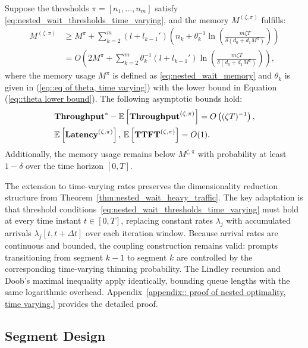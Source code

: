\begin{theorem}
\label{thm:nested_wait_heavy_traffic_time_varying}
Suppose the thresholds $\pi = [n_1, \dots, n_m]$ satisfy \eqref{eq:nested_wait_thresholds_time_varying}, and the memory $M^{(\zeta,\pi)}$ fulfills:
\[
\begin{aligned}
M^{(\zeta,\pi)}
&\geq M^{\pi} + \sum_{k=2}^m (l + l_{k-1}') \left(n_k + \theta_k^{-1} \ln\!\left( \tfrac{m \zeta T}{\delta(d_0+d_1M^\pi)} \right)\right) \\
    &= O\!\left( 2M^\pi + \sum_{k=2}^m \theta_k^{-1}  (l + l_{k-1}') \ln\!\left( \tfrac{m \zeta T}{\delta(d_0+d_1M^\pi)} \right) \right),
\end{aligned}
\]
where the memory usage $M^\pi$ is defined as \eqref{eq:nested_wait_memory} and $\theta_k$ is given in (\ref{eq::eq of theta, time varying}) with the lower bound in Equation (\ref{eq::theta lower bound}).
The following asymptotic bounds hold:
$$
    \begin{aligned}
        &\textbf{Throughput}^* - \mathbb{E}\left[ \textbf{Throughput}^{(\zeta, \pi)} \right] 
   = O\left( (\zeta T)^{-1} \right), \\
&\mathbb{E}\left[ \textbf{Latency}^{(\zeta, \pi)} \right], \,\mathbb{E}\left[ \textbf{TTFT}^{(\zeta, \pi)} \right] = O(1).
    \end{aligned}
$$
Additionally, the memory usage remains below $M^{\zeta,\pi}$ with probability at least $1 - \delta$ over the time horizon $[0,T].$
\end{theorem}

The extension to time-varying rates preserves the dimensionality reduction structure from Theorem~\ref{thm:nested_wait_heavy_traffic}. The key adaptation is that threshold conditions~\eqref{eq:nested_wait_thresholds_time_varying} must hold at every time instant $t \in [0,T]$, replacing constant rates $\lambda_j$ with accumulated arrivals $\lambda_j[t, t+\Delta t]$ over each iteration window. Because arrival rates are continuous and bounded, the coupling construction remains valid: prompts transitioning from segment \(k-1\) to segment \(k\) are controlled by the corresponding time-varying thinning probability. The Lindley recursion and Doob's maximal inequality apply identically, bounding queue lengths with the same logarithmic overhead. Appendix~\ref{appendix:: proof of nested optimality, time varying.} provides the detailed proof.

\subsection{Segment Design}\label{sec:segment_design}

